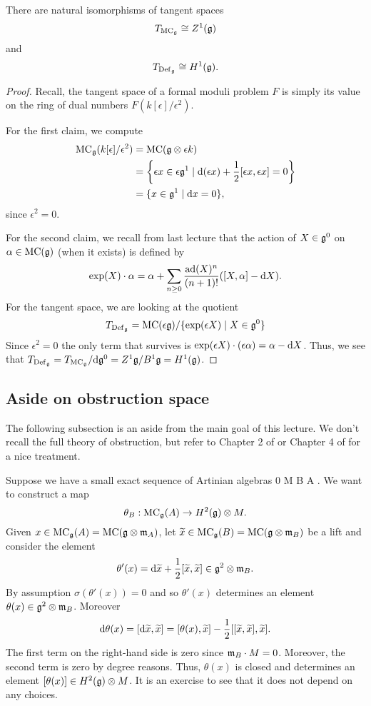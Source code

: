 \documentclass[11pt]{amsart}
\begin{document}
\begin{prop}
There are natural isomorphisms of tangent spaces
\[
T_{{\rm MC}_\mathfrak g} \cong Z^1(\mathfrak g)
\] 
and 
\[
T_{{\rm Def}_\mathfrak g} \cong H^1(\mathfrak g) .
\] 
\end{prop}
\begin{proof}
Recall, the tangent space of a formal moduli problem $F$ is simply its value on the ring of dual numbers $F(k[\epsilon]/\epsilon^2)$. 

For the first claim, we compute
\begin{align*}
{\rm MC}_\mathfrak g(k[\epsilon]/\epsilon^2) & = {\rm MC}(\mathfrak g \otimes \epsilon k) \\ & = \left\{\epsilon x \in \epsilon \mathfrak g^1 \; | \; {\rm d} (\epsilon x) + \frac{1}{2} [\epsilon x, \epsilon x] = 0 \right\} \\ & = \{x \in \mathfrak g^1 \; | \; {\rm d} x = 0\} ,
\end{align*}
since $\epsilon^2 = 0$. 

For the second claim, we recall from last lecture that the action of $X \in \mathfrak g^0$ on $\alpha \in {\rm MC}(\mathfrak g)$ (when it exists) is defined by 
\[
\exp(X) \cdot \alpha = \alpha + \sum_{n \geq 0} \frac{{\rm ad}(X)^n}{(n+1)!} ([X, \alpha] - {\rm d} X) .
\]
For the tangent space, we are looking at the quotient 
\[
T_{{\rm Def}_\mathfrak g} = {\rm MC}(\epsilon \mathfrak g) / \{\exp(\epsilon X) \; | \; X \in \mathfrak g^0\}
\] 
Since $\epsilon^2 = 0$ the only term that survives is $\exp(\epsilon X) \cdot (\epsilon \alpha) = \alpha - {\rm d} X$.
Thus, we see that $T_{{\rm Def}_\mathfrak g} = T_{{\rm MC}_\mathfrak g} / {\rm d} \mathfrak g^0 = Z^1 \mathfrak g / B^1 \mathfrak g = H^1(\mathfrak g)$. 
\end{proof}

\subsection{Aside on obstruction space}

The following subsection is an aside from the main goal of this lecture. 
We don't recall the full theory of obstruction, but refer to Chapter 2 of \cite{Manetti1999} or Chapter 4 of \cite{Manetti2009} for a nice treatment. 

Suppose we have a small exact sequence of Artinian algebras
\beqn\label{smallexact}
0 \to M \to B \xto{\sigma} A  .
\eeqn
We want to construct a map
\[
\theta_B : {\rm MC}_\mathfrak g(A) \to H^2(\mathfrak g) \otimes M .
\]
Given $x \in {\rm MC}_{\mathfrak g}(A) = {\rm MC}(\mathfrak g \otimes {\mathfrak m}_A)$, let $\widetilde{x} \in {\rm MC}_\mathfrak g(B) = {\rm MC}(\mathfrak g \otimes {\mathfrak m}_B)$ be a lift and consider the element 
\[
\theta'(x) = {\rm d} \widetilde{x} + \frac{1}{2}[\widetilde{x}, \widetilde{x}] \in \mathfrak g^2 \otimes {\mathfrak m}_B .
\] 
By assumption $\sigma(\theta'(x)) = 0$ and so $\theta'(x)$ determines an element $\theta(x) \in \mathfrak g^2 \otimes {\mathfrak m}_B$.
Moreover
\[
{\rm d} \theta(x) = [{\rm d} \widetilde{x}, \widetilde{x}] = [\theta(x), \widetilde{x}] - \frac{1}{2} [[\widetilde{x},\widetilde{x}],\widetilde{x}]  .
\]
The first term on the right-hand side is zero since ${\mathfrak m}_B \cdot M = 0$.
Moreover, the second term is zero by degree reasons. 
Thus, $\theta(x)$ is closed and determines an element $[\theta(x)] \in H^2(\mathfrak g) \otimes M$. 
It is an exercise to see that it does not depend on any choices. 
\end{document}
